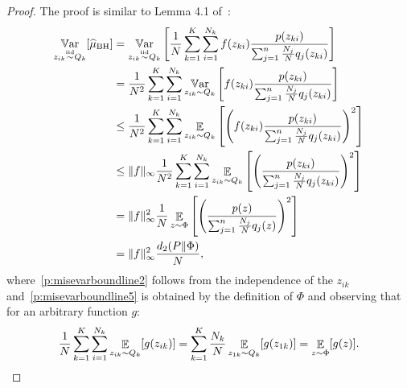 \documentclass{article}
\begin{document}
\misevarbound*
%
\begin{proof}
	The proof is similar to Lemma 4.1 of~\cite{metelli2018policy}:
    \begin{align}
    \mathop{\mathbb{V}\mathrm{ar}}_{z_{ik} \stackrel{\text{iid}}{\sim} Q_k} [\widehat{\mu}_{\text{BH}}]&  = \mathop{\mathbb{V}\mathrm{ar}}_{z_{ik} \stackrel{\text{iid}}{\sim} Q_k} \left[ \frac{1}{N} \sum_{k=1}^K \sum_{i=1}^{N_k}  f(z_{ki})\frac{p(z_{ki})}{\sum_{j=1}^n \frac{N_j}{N} q_j(z_{ki})} \right] \notag \\
    & = \frac{1}{N^2} \sum_{k=1}^K \sum_{i=1}^{N_k} \mathop{\mathbb{V}\mathrm{ar}}_{z_{ik} \sim Q_k} \left[   f(z_{ki}) \frac{p(z_{ki})}{\sum_{j=1}^n \frac{N_j}{N} q_j(z_{ki})} \right] \label{p:misevarboundline2} \\
    & \le \frac{1}{N^2} \sum_{k=1}^K \sum_{i=1}^{N_k} \mathop{\mathbb{E}}_{z_{ik} \sim Q_k} \left[   \left( f(z_{ki})   \frac{p(z_{ki})}{\sum_{j=1}^n \frac{N_j}{N} q_j(z_{ki})} \right)^2 \right] \notag\\
    & \le \|f\|_{\infty} \frac{1}{N^2} \sum_{k=1}^K \sum_{i=1}^{N_k} \mathop{\mathbb{E}}_{z_{ik} \sim Q_k} \left[   \left( \frac{p(z_{ki})}{\sum_{j=1}^n \frac{N_j}{N} q_j(z_{ki})} \right)^2 \right]  \notag\\
    & = \|f\|_{\infty}^2 \frac{1}{N} \mathop{\mathbb{E}}_{z \sim \Phi} \left[ \left(\frac{p(z)}{\sum_{j=1}^n \frac{N_j}{N} q_j(z)} \right)^2 \right] \label{p:misevarboundline5}\\
    &= \|f\|_{\infty}^2 \frac{d_{2}(P\|\Phi)}{N},  \notag
    \end{align}
    where~\eqref{p:misevarboundline2} follows from the independence of the $z_{ik}$ and~\eqref{p:misevarboundline5} is obtained by the definition of $\Phi$ and observing that for an arbitrary function $g$:
    \begin{equation}
    \label{eq:expectationdecomposition}
    	\frac{1}{N} \sum_{k=1}^K \sum_{i=1}^{N_k} \mathop{\mathbb{E}}_{z_{ik} \sim Q_k}[g(z_{ik})] =  \sum_{k=1}^K \frac{N_k}{N} \mathop{\mathbb{E}}_{z_{1k} \sim Q_k}[g(z_{1k})] = \mathop{\mathbb{E}}_{z \sim \Phi}[g(z)].
    \end{equation}
\end{proof}
\end{document}
